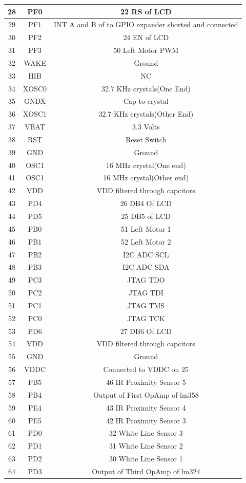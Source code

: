 \documentclass[a4paper,10pt,oneside]{article}
\begin{document}
{\begin{longtable}{|c|c|c|}
				28 &	PF0	 &	22 RS of LCD\\ \hline
				29 &	PF1	 &	INT A and B of to GPIO expander shorted and connected\\ \hline
				30 &	PF2 &	24 EN of LCD\\ \hline
				31 &	PF3	 &	50 Left Motor PWM\\ \hline
				32 &	WAKE &	Ground\\ \hline
				33 &	HIB &	NC\\ \hline
				34 &	XOSC0 &	32.7 KHz crystals(One End)\\ \hline
				35 &	GNDX &	Cap to crystal\\ \hline
				36 &	XOSC1 &	32.7 KHz crystals(Other End)\\  \hline
				37 &	VBAT &	3.3 Volts\\ \hline
				38 &	RST	 &	Reset Switch\\ \hline
				39 &	GND	 &	Ground\\ \hline
				40 &	OSC1 &	16 MHz crystal(One end)\\ \hline
				41 &	OSC1 &	16 MHz crystal(Other end)\\ \hline
				42 &	VDD	 &	VDD filtered through capcitors\\ \hline
				43 &	PD4	 &	26 DB4 Of LCD \\ \hline
				44 &	PD5	 &	25 DB5 of LCD\\ \hline
				45 &	PB0	 &	51 Left Motor 1\\ \hline
				46 &	PB1	 &	52 Left Motor 2\\ \hline
				47 &	PB2	 &	I2C ADC SCL\\ \hline 
				48 &	PB3	 &	I2C ADC SDA\\ \hline
				49 &	PC3	 &	JTAG TDO\\ \hline
				50 &	PC2	 &	JTAG TDI\\ \hline
				51 &	PC1	 &	JTAG TMS\\ \hline
				52 &	PC0	 &	JTAG TCK\\ \hline
				53 &	PD6	 &	27 DB6 Of LCD\\ \hline
				54 &	VDD	 &	VDD filtered through capcitors\\ \hline
				55 &	GND	 &	Ground\\ \hline
				56 &	VDDC &	Connected to VDDC on 25\\ \hline
				57 &	PB5	 &	46 IR Proximity Sensor 5\\ \hline
				58 &	PB4	 &	Output of First OpAmp of lm358\\ \hline
				59 &	PE4	 &	43 IR Proximity Sensor 4\\ \hline
				60 &	PE5	 &	42 IR Proximity Sensor 3\\ \hline
				61 &	PD0	 &	32 White Line Sensor 3\\ \hline
				62 &	PD1	 &	31 White Line Sensor 2\\ \hline
				63 &	PD2	 &	30 White Line Sensor 1\\ \hline
				64 &	PD3	 &	Output of Third OpAmp of lm324\\ \hline
			\end{longtable}
}
\end{document}
